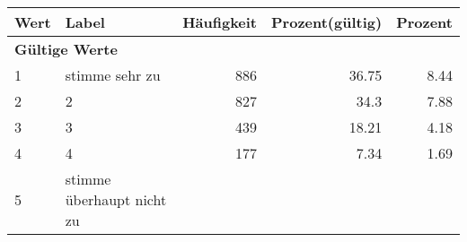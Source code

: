      \begin{longtable}{lXrrr}
     \toprule
     \textbf{Wert} & \textbf{Label} & \textbf{Häufigkeit} & \textbf{Prozent(gültig)} & \textbf{Prozent} \\
     \endhead
     \midrule
     \multicolumn{5}{l}{\textbf{Gültige Werte}}\\

     1 &
     \multicolumn{1}{X}{ stimme sehr zu   } &


       \num{886} &
       \num[round-mode=places,round-precision=2]{36,75} &
         \num[round-mode=places,round-precision=2]{8,44} \\

     2 &
     \multicolumn{1}{X}{ 2   } &


       \num{827} &
       \num[round-mode=places,round-precision=2]{34,3} &
         \num[round-mode=places,round-precision=2]{7,88} \\

     3 &
     \multicolumn{1}{X}{ 3   } &


       \num{439} &
       \num[round-mode=places,round-precision=2]{18,21} &
         \num[round-mode=places,round-precision=2]{4,18} \\

     4 &
     \multicolumn{1}{X}{ 4   } &


       \num{177} &
       \num[round-mode=places,round-precision=2]{7,34} &
         \num[round-mode=places,round-precision=2]{1,69} \\

     5 &
     \multicolumn{1}{X}{ stimme überhaupt nicht zu   } &



\end{longtable}
